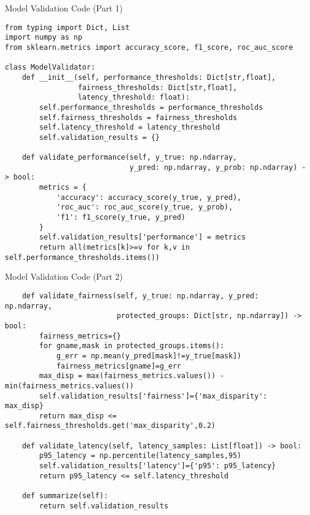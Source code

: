 \documentclass[aspectratio=169]{beamer}
\begin{document}

\begin{frame}[fragile]{Model Validation Code (Part 1)}
\begin{verbatim}
from typing import Dict, List
import numpy as np
from sklearn.metrics import accuracy_score, f1_score, roc_auc_score

class ModelValidator:
    def __init__(self, performance_thresholds: Dict[str,float],
                 fairness_thresholds: Dict[str,float],
                 latency_threshold: float):
        self.performance_thresholds = performance_thresholds
        self.fairness_thresholds = fairness_thresholds
        self.latency_threshold = latency_threshold
        self.validation_results = {}

    def validate_performance(self, y_true: np.ndarray,
                             y_pred: np.ndarray, y_prob: np.ndarray) -> bool:
        metrics = {
            'accuracy': accuracy_score(y_true, y_pred),
            'roc_auc': roc_auc_score(y_true, y_prob),
            'f1': f1_score(y_true, y_pred)
        }
        self.validation_results['performance'] = metrics
        return all(metrics[k]>=v for k,v in self.performance_thresholds.items())
\end{verbatim}
\end{frame}


\begin{frame}[fragile]{Model Validation Code (Part 2)}
\begin{verbatim}
    def validate_fairness(self, y_true: np.ndarray, y_pred: np.ndarray,
                          protected_groups: Dict[str, np.ndarray]) -> bool:
        fairness_metrics={}
        for gname,mask in protected_groups.items():
            g_err = np.mean(y_pred[mask]!=y_true[mask])
            fairness_metrics[gname]=g_err
        max_disp = max(fairness_metrics.values()) - min(fairness_metrics.values())
        self.validation_results['fairness']={'max_disparity': max_disp}
        return max_disp <= self.fairness_thresholds.get('max_disparity',0.2)

    def validate_latency(self, latency_samples: List[float]) -> bool:
        p95_latency = np.percentile(latency_samples,95)
        self.validation_results['latency']={'p95': p95_latency}
        return p95_latency <= self.latency_threshold

    def summarize(self):
        return self.validation_results
\end{verbatim}
\end{frame}
\end{document}
